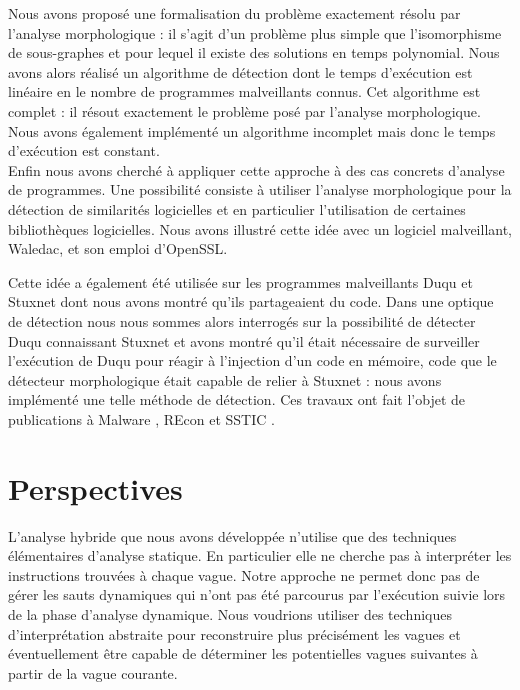 Nous avons proposé une formalisation du problème exactement résolu par l'analyse morphologique : il s'agit d'un problème plus simple que l'isomorphisme de sous-graphes et pour lequel il existe des solutions en temps polynomial.
Nous avons alors réalisé un algorithme de détection dont le temps d'exécution est linéaire en le nombre de programmes malveillants connus. Cet algorithme est complet : il résout exactement le problème posé par l'analyse morphologique.
Nous avons également implémenté un algorithme incomplet mais donc le temps d'exécution est constant.
\\

Enfin nous avons cherché à appliquer cette approche à des cas concrets d'analyse de programmes.
Une possibilité consiste à utiliser l'analyse morphologique pour la détection de similarités logicielles et en particulier l'utilisation de certaines bibliothèques logicielles.
Nous avons illustré cette idée avec un logiciel malveillant, Waledac, et son emploi d'OpenSSL.

Cette idée a également été utilisée sur les programmes malveillants Duqu et Stuxnet dont nous avons montré qu'ils partageaient du code.
Dans une optique de détection nous nous sommes alors interrogés sur la possibilité de détecter Duqu connaissant Stuxnet et avons montré qu'il était nécessaire de surveiller l'exécution de Duqu pour réagir à l'injection d'un code en mémoire, code que le détecteur morphologique était capable de relier à Stuxnet : nous avons implémenté une telle méthode de détection.
Ces travaux ont fait l'objet de publications à Malware \cite{mal12,mal13}, REcon \cite{REAT12} et SSTIC \cite{sstic13}.







\section*{Perspectives}
L'analyse hybride que nous avons développée n'utilise que des techniques élémentaires d'analyse statique.
En particulier elle ne cherche pas à interpréter les instructions trouvées à chaque vague. 
Notre approche ne permet donc pas de gérer les sauts dynamiques qui n'ont pas été parcourus par l'exécution suivie lors de la phase d'analyse dynamique.
Nous voudrions utiliser des techniques d’interprétation abstraite pour reconstruire plus précisément les vagues et éventuellement être capable de déterminer les potentielles vagues suivantes à partir de la vague courante.

